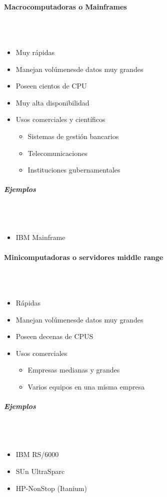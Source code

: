 \paragraph{Macrocomputadoras o Mainframes}\mbox{}\\\\%
\begin{itemize}
\item Muy rápidas
\item Manejan volúmenesde datos muy grandes
\item Poseen cientos de CPU
\item Muy alta disponibilidad
\item Usos comerciales y científicos
	\begin{itemize}
	\item Sistemas de gestión bancarios
	\item Telecomunicaciones
	\item Instituciones gubernamentales
	\end{itemize}
\end{itemize}

\subparagraph{Ejemplos}\mbox{}\\\\
\begin{itemize}
\item IBM Mainframe
\end{itemize}

\paragraph{Minicomputadoras o servidores middle range}\mbox{}\\\\%
\begin{itemize}
\item Rápidas
\item Manejan volúmenesde datos muy grandes
\item Poseen decenas de CPUS
\item Usos comerciales
	\begin{itemize}
	\item Empresas medianas y grandes
	\item Varios equipos en una misma empresa
	\end{itemize}
\end{itemize}

\subparagraph{Ejemplos}\mbox{}\\\\
\begin{itemize}
\item IBM RS/6000
\item SUn UltraSparc
\item HP-NonStop (Itanium)
\end{itemize}

